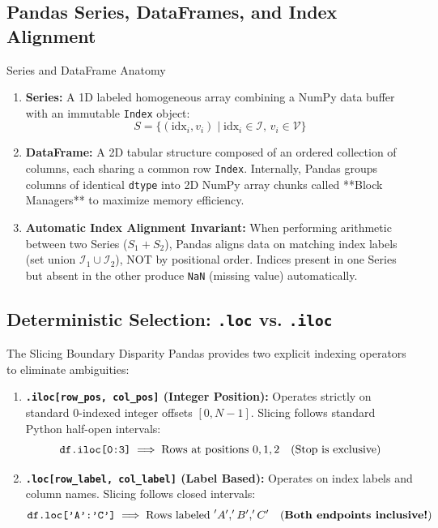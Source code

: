 \subsection{Pandas Series, DataFrames, and Index Alignment}

\begin{definitionbox}{Series and DataFrame Anatomy}
  
\begin{enumerate}
    \item \textbf{Series:} A 1D labeled homogeneous array combining a NumPy data buffer with an immutable \texttt{Index} object:
    \begin{equation}
    S = \{(\text{idx}_i, v_i) \mid \text{idx}_i \in \mathcal{I}, \, v_i \in \mathcal{V}\}
    \end{equation}
    \item \textbf{DataFrame:} A 2D tabular structure composed of an ordered collection of columns, each sharing a common row \texttt{Index}. Internally, Pandas groups columns of identical \texttt{dtype} into 2D NumPy array chunks called **Block Managers** to maximize memory efficiency.
    \item \textbf{Automatic Index Alignment Invariant:} When performing arithmetic between two Series ($S_1 + S_2$), Pandas aligns data on matching index labels (set union $\mathcal{I}_1 \cup \mathcal{I}_2$), NOT by positional order. Indices present in one Series but absent in the other produce \texttt{NaN} (missing value) automatically.
\end{enumerate}
\end{definitionbox}

\subsection{Deterministic Selection: \texttt{.loc} vs. \texttt{.iloc}}

\begin{theorembox}{The Slicing Boundary Disparity}
 
Pandas provides two explicit indexing operators to eliminate ambiguities:
\begin{enumerate}
    \item \textbf{\texttt{.iloc[row\_pos, col\_pos]} (Integer Position):}
    Operates strictly on standard 0-indexed integer offsets $[0, N-1]$. Slicing follows standard Python half-open intervals:
    \begin{equation}
    \text{\texttt{df.iloc[0:3]}} \implies \text{Rows at positions } 0, 1, 2 \quad (\text{Stop is exclusive})
    \end{equation}
    \item \textbf{\texttt{.loc[row\_label, col\_label]} (Label Based):}
    Operates on index labels and column names. Slicing follows closed intervals:
    \begin{equation}
    \text{\texttt{df.loc['A':'C']}} \implies \text{Rows labeled } 'A', 'B', 'C' \quad (\text{\textbf{Both endpoints inclusive!}})
    \end{equation}
\end{enumerate}
\end{theorembox}

